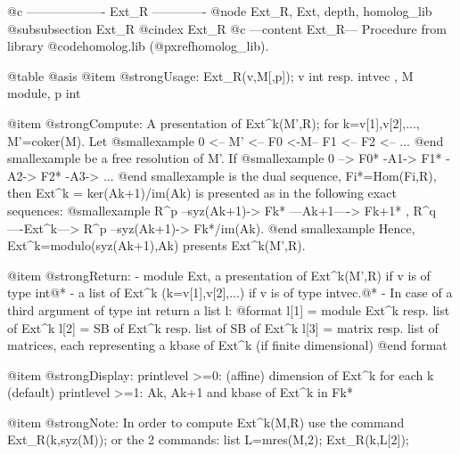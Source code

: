 @c ------------------- Ext_R -------------
@node Ext_R, Ext, depth, homolog_lib
@subsubsection Ext_R
@cindex Ext_R
@c ---content Ext_R---
Procedure from library @code{homolog.lib} (@pxref{homolog_lib}).

@table @asis
@item @strong{Usage:}
Ext_R(v,M[,p]); v int resp. intvec , M module, p int

@item @strong{Compute:}
A presentation of Ext^k(M',R); for k=v[1],v[2],..., M'=coker(M).
Let
@smallexample
  0 <-- M' <-- F0 <-M-- F1 <-- F2 <-- ...
@end smallexample
be a free resolution of M'. If
@smallexample
        0 --> F0* -A1-> F1* -A2-> F2* -A3-> ...
@end smallexample
is the dual sequence, Fi*=Hom(Fi,R), then Ext^k = ker(Ak+1)/im(Ak)
is presented as in the following exact sequences:
@smallexample
    R^p --syz(Ak+1)-> Fk* ---Ak+1---->  Fk+1* ,
    R^q ----Ext^k---> R^p --syz(Ak+1)-> Fk*/im(Ak).
@end smallexample
Hence, Ext^k=modulo(syz(Ak+1),Ak) presents Ext^k(M',R).

@item @strong{Return:}
- module Ext, a presentation of Ext^k(M',R) if v is of type int@*
- a list of Ext^k (k=v[1],v[2],...) if v is of type intvec.@*
- In case of a third argument of type int return a list l:
@format
     l[1] = module Ext^k resp. list of Ext^k
     l[2] = SB of Ext^k resp. list of SB of Ext^k
     l[3] = matrix resp. list of matrices, each representing a kbase of Ext^k 
              (if finite dimensional)
@end format

@item @strong{Display:}
printlevel >=0: (affine) dimension of Ext^k for each k (default)
printlevel >=1: Ak, Ak+1 and kbase of Ext^k in Fk*

@item @strong{Note:}
In order to compute Ext^k(M,R) use the command Ext_R(k,syz(M));
or the 2 commands: list L=mres(M,2); Ext_R(k,L[2]);

